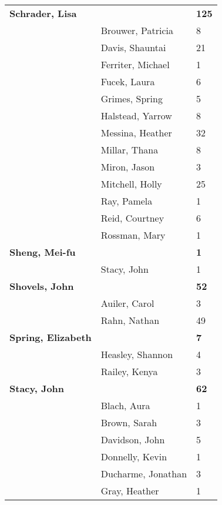 \documentclass{article}\usepackage[]{graphicx}\usepackage[]{color}
\begin{document}
{\begin{longtable} { >{\raggedright}p{}|p{}p{}}
   \rowcolor[gray]{0.90}\textbf{Schrader, Lisa} &  & \hspace{2cm}\textbf{125} \\ 
   & Brouwer, Patricia & 8 \\ 
   & Davis, Shauntai & 21 \\ 
   & Ferriter, Michael & 1 \\ 
   \rowcolor[gray]{0.90} & Fucek, Laura & 6 \\ 
   \rowcolor[gray]{0.90} & Grimes, Spring & 5 \\ 
   \rowcolor[gray]{0.90} & Halstead, Yarrow & 8 \\ 
   & Messina, Heather & 32 \\ 
   & Millar, Thana & 8 \\ 
   & Miron, Jason & 3 \\ 
   \rowcolor[gray]{0.90} & Mitchell, Holly & 25 \\ 
   \rowcolor[gray]{0.90} & Ray, Pamela & 1 \\ 
   \rowcolor[gray]{0.90} & Reid, Courtney & 6 \\ 
   & Rossman, Mary & 1 \\ 
  \textbf{Sheng, Mei-fu} &  & \hspace{2cm}\textbf{1} \\ 
   & Stacy, John & 1 \\ 
   \rowcolor[gray]{0.90}\textbf{Shovels, John} &  & \hspace{2cm}\textbf{52} \\ 
   \rowcolor[gray]{0.90} & Auiler, Carol & 3 \\ 
   \rowcolor[gray]{0.90} & Rahn, Nathan & 49 \\ 
  \textbf{Spring, Elizabeth} &  & \hspace{2cm}\textbf{7} \\ 
   & Heasley, Shannon & 4 \\ 
   & Railey, Kenya & 3 \\ 
   \rowcolor[gray]{0.90}\textbf{Stacy, John} &  & \hspace{2cm}\textbf{62} \\ 
   \rowcolor[gray]{0.90} & Blach, Aura & 1 \\ 
   \rowcolor[gray]{0.90} & Brown, Sarah & 3 \\ 
   & Davidson, John & 5 \\ 
   & Donnelly, Kevin & 1 \\ 
   & Ducharme, Jonathan & 3 \\ 
   \rowcolor[gray]{0.90} & Gray, Heather & 1 \\ 

\end{longtable}}
\end{document}

